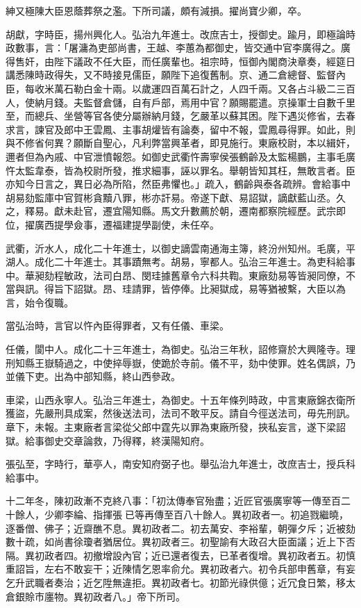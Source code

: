 \begin{pinyinscope}
紳又極陳大臣恩蔭葬祭之濫。下所司議，頗有減損。擢尚寶少卿，卒。

胡獻，字時臣，揚州興化人。弘治九年進士。改庶吉士，授御史。踰月，即極論時政數事，言：「屠滽為吏部尚書，王越、李蕙為都御史，皆交通中官李廣得之。廣得售奸，由陛下議政不任大臣，而任廣輩也。祖宗時，恒御內閣商決章奏，經筵日講悉陳時政得失，又不時接見儒臣，願陛下追復舊制。京、通二倉總督、監督內臣，每收米萬石勒白金十兩。以歲運四百萬石計之，人四千兩。又各占斗級二三百人，使納月錢。夫監督倉儲，自有戶部，焉用中官？願賜罷遣。京操軍士自數千里至，而總兵、坐營等官各使分屬辦納月錢，乞嚴革以蘇其困。陛下遇災修省，去春求言，諫官及郎中王雲鳳、主事胡爟皆有論奏，留中不報，雲鳳尋得罪。如此，則與不修省何異？願斷自聖心，凡利弊當興革者，即見施行。東廠校尉，本以緝奸，邇者但為內戚、中官泄憤報怨。如御史武衢忤壽寧侯張鶴齡及太監楊鵬，主事毛廣忤太監韋泰，皆為校尉所發，推求細事，誣以罪名。舉朝皆知其枉，無敢言者。臣亦知今日言之，異日必為所陷，然臣弗懼也。」疏入，鶴齡與泰各疏辨。會給事中胡易劾監庫中官賀彬貪黷八罪，彬亦訐易。帝遂下獻、易詔獄，謫獻藍山丞。久之，釋易。獻未赴官，遷宜陽知縣。馬文升數薦於朝，遷南都察院經歷。武宗即位，擢廣西提學僉事，遷福建提學副使，未任卒。

武衢，沂水人，成化二十年進士，以御史謫雲南通海主簿，終汾州知州。毛廣，平湖人。成化二十年進士。其事蹟無考。胡易，寧都人。弘治三年進士。為吏科給事中。華昶劾程敏政，法司白昂、閔珪據舊章令六科共鞫。東廠劾易等皆昶同僚，不當與訊。得旨下詔獄。昂、珪請罪，皆停俸。比昶獄成，易等猶被繫，大臣以為言，始令復職。

當弘治時，言官以忤內臣得罪者，又有任儀、車梁。

任儀，閬中人。成化二十三年進士，為御史。弘治三年秋，詔修齋於大興隆寺。理刑知縣王嶽騎過之，中使捽辱嶽，使跪於寺前。儀不平，劾中使罪。姓名偶誤，乃並儀下吏。出為中部知縣，終山西參政。

車梁，山西永寧人。弘治三年進士，為御史。十五年條列時政，中言東廠錦衣衛所獲盜，先嚴刑具成案，然後送法司，法司不敢平反。請自今徑送法司，毋先刑訊。章下，未報。主東廠者言梁從父郎中霆先以罪為東廠所發，挾私妄言，遂下梁詔獄。給事御史交章論救，乃得釋，終漢陽知府。

張弘至，字時行，華亭人，南安知府弼子也。舉弘治九年進士，改庶吉士，授兵科給事中。

十二年冬，陳初政漸不克終八事：「初汰傳奉官殆盡；近匠官張廣寧等一傳至百二十餘人，少卿李綸、指揮張已等再傳至百八十餘人。異初政者一。初追戮繼曉，逐番僧、佛子；近齋醮不息。異初政者二。初去萬安、李裕輩，朝彈夕斥；近被劾數十疏，如尚書徐瓊者猶居位。異初政者三。初聖諭有大政召大臣面議；近上下否隔。異初政者四。初撤增設內官；近已還者復去，已革者復增。異初政者五。初慎重詔旨，左右不敢妄干；近陳情乞恩率俞允。異初政者六。初令兵部申舊章，有妄乞升武職者奏治；近乞陞無違拒。異初政者七。初節光祿供億；近冗食日繁，移太倉銀賒市廛物。異初政者八。」帝下所司。


\end{pinyinscope}
